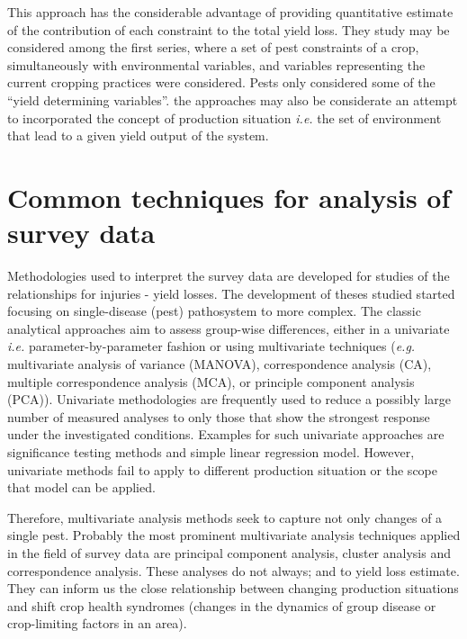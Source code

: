 \documentclass[12pt, oneside]{report}
\begin{document}
This approach has the considerable advantage of providing quantitative estimate of the contribution of each constraint to the total yield loss. They study may be considered among the first series, where a set of pest constraints of a crop, simultaneously with environmental variables, and variables representing the current cropping practices were considered. Pests only considered some of the ``yield determining variables''. the approaches may also be considerate an attempt to incorporated the concept of production situation \textit{i.e.} the set of environment that lead to a given yield output of the system. 

\section*{Common techniques for analysis of survey data}

Methodologies used to interpret the survey data are developed for studies of the relationships for injuries - yield losses. The development of theses studied started focusing on single-disease (pest) pathosystem to more complex. The classic analytical approaches aim to assess group-wise differences, either in a univariate \textit{i.e.} parameter-by-parameter fashion or using multivariate techniques (\textit{e.g.} multivariate analysis of variance (MANOVA), correspondence analysis (CA), multiple correspondence analysis (MCA), or principle component analysis (PCA)). Univariate methodologies are frequently used to reduce a possibly large number of measured analyses to only those that show the strongest response under the investigated conditions. Examples for such univariate approaches are significance testing methods and simple linear regression model. However, univariate methods fail to apply to different production situation or the scope that model can be applied.


Therefore, multivariate analysis methods seek to capture not only changes of a single pest. Probably the most prominent multivariate analysis techniques applied in the field of survey data are principal component analysis, cluster analysis and correspondence analysis. These analyses do not always; and to yield loss estimate. They can inform us the close relationship between changing production situations and shift crop health syndromes (changes in the dynamics of group disease or crop-limiting factors in an area). 
\end{document}
